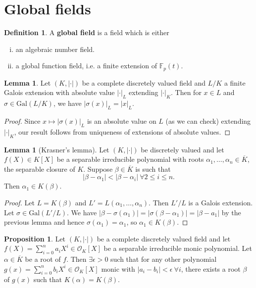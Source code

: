 \documentclass{article}
\theoremstyle{definition}
\newtheorem{lemma}[theorem]{Lemma}
\newtheorem{prop}[theorem]{Proposition}
\newtheorem{defn}{Definition}[section]
\begin{document}
\section{Global fields}
\begin{defn}
    A \textbf{global field} is a field which is either 
    \begin{enumerate}[(i)]
        \item an algebraic number field.
        \item a global function field, i.e. a finite extension of $\mathbb{F}_p(t)$.
    \end{enumerate}
\end{defn}
\begin{lemma}
    Let $(K,|\cdot|)$ be a complete discretely valued field and $L/K$ a finite Galois extension with absolute value $|\cdot|_L$ extending $|\cdot|_K$. Then for $x \in L$ and $\sigma \in \text{Gal}(L/K)$, we have $|\sigma(x)|_L = |x|_L$.
\end{lemma}
\begin{proof}
    Since $x \mapsto |\sigma(x)|_L$ is an absolute value on $L$ (as we can check) extending $|\cdot|_K$, our result follows from uniqueness of extensions of absolute values.
\end{proof}
\begin{lemma}[Krasner's lemma]
    Let $(K,|\cdot|)$ be discretely valued and let $f(X) \in K[X]$ be a separable irreducible polynomial with roots $\alpha_1,\ldots,\alpha_n \in \overline{K}$, the separable closure of $K$. Suppose $\beta \in \overline{K}$ is such that \[
    |\beta-\alpha_1|< |\beta-\alpha_i| ~\forall 2\le i\le n.
    \]
    Then $\alpha_1 \in K(\beta)$.
\end{lemma}
\begin{proof}
    Let $L = K(\beta)$ and $L' = L(\alpha_1,\ldots,\alpha_n)$. Then $L'/L$ is a Galois extension. Let $\sigma \in \text{Gal}(L'/L)$. We have $|\beta - \sigma(\alpha_1)| = |\sigma(\beta-\alpha_1)| = |\beta-a_1|$ by the previous lemma and hence $\sigma(\alpha_1)=\alpha_1$, so $\alpha_1 \in K(\beta)$.
\end{proof}
\begin{prop}\label{prop8.3}
    Let $(K,|\cdot|)$ be a complete discretely valued field and let $f(X) = \sum_{i=0}^{n} a_iX^i \in \mathcal{O}_K[X]$ be a separable irreducible monic polynomial. Let $\alpha \in \overline{K}$ be a root of $f$. Then $\exists \epsilon>0$ such that for any other polynomial $g(x) = \sum_{i=0}^{n} b_iX^i \in \mathcal{O}_K[X]$ monic with $|a_i-b_i|<\epsilon ~\forall i$, there exists a root $\beta$ of $g(x)$ such that $K(\alpha)=K(\beta)$.
\end{prop}
\end{document}
